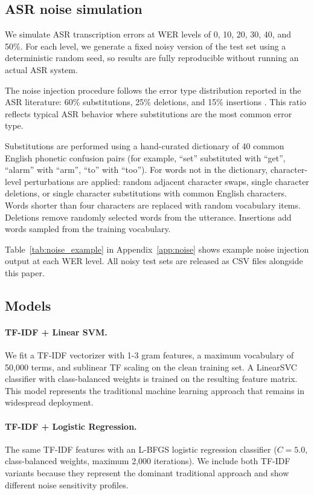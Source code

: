 \documentclass[11pt,a4paper]{article}
\begin{document}
\subsection{ASR noise simulation}

We simulate ASR transcription errors at WER levels of 0, 10, 20, 30, 40, and 50\%. For each level, we generate a fixed noisy version of the test set using a deterministic random seed, so results are fully reproducible without running an actual ASR system.

The noise injection procedure follows the error type distribution reported in the ASR literature: 60\% substitutions, 25\% deletions, and 15\% insertions \citep{wang2003word}. This ratio reflects typical ASR behavior where substitutions are the most common error type.

Substitutions are performed using a hand-curated dictionary of 40 common English phonetic confusion pairs (for example, ``set'' substituted with ``get'', ``alarm'' with ``arm'', ``to'' with ``too''). For words not in the dictionary, character-level perturbations are applied: random adjacent character swaps, single character deletions, or single character substitutions with common English characters. Words shorter than four characters are replaced with random vocabulary items. Deletions remove randomly selected words from the utterance. Insertions add words sampled from the training vocabulary.

Table~\ref{tab:noise_example} in Appendix~\ref{app:noise} shows example noise injection output at each WER level. All noisy test sets are released as CSV files alongside this paper.

\subsection{Models}

\paragraph{TF-IDF + Linear SVM.}
We fit a TF-IDF vectorizer with 1-3 gram features, a maximum vocabulary of 50,000 terms, and sublinear TF scaling on the clean training set. A LinearSVC classifier with class-balanced weights is trained on the resulting feature matrix. This model represents the traditional machine learning approach that remains in widespread deployment.

\paragraph{TF-IDF + Logistic Regression.}
The same TF-IDF features with an L-BFGS logistic regression classifier ($C=5.0$, class-balanced weights, maximum 2,000 iterations). We include both TF-IDF variants because they represent the dominant traditional approach and show different noise sensitivity profiles.
\end{document}
